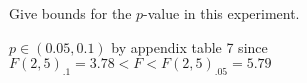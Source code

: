 Give bounds for the $p$-value in this experiment.

\soln*$p \in (0.05, 0.1)$ by appendix table 7 since $F(2,5)_{.1} = 3.78 <F < F(2,5)_{.05} = 5.79$